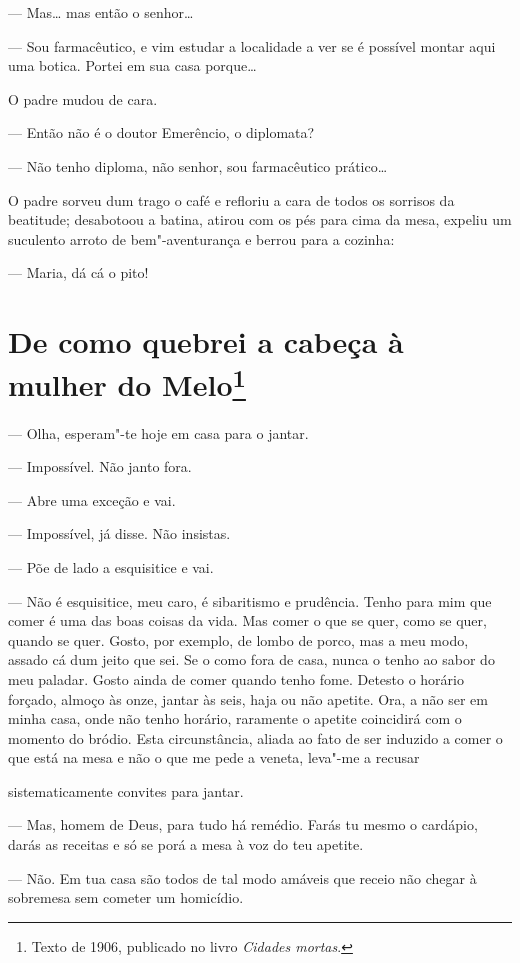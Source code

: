 --- Mas\ldots{} mas então o senhor\ldots{}

--- Sou farmacêutico, e vim estudar a localidade a ver se é possível
montar aqui uma botica. Portei em sua casa porque\ldots{}

O padre mudou de cara.

--- Então não é o doutor Emerêncio, o diplomata?

--- Não tenho diploma, não senhor, sou farmacêutico prático\ldots{}

O padre sorveu dum trago o café e refloriu a cara de todos os sorrisos
da beatitude; desabotoou a batina, atirou com os pés para cima da mesa,
expeliu um suculento arroto de bem"-aventurança e berrou para a cozinha:

--- Maria, dá cá o pito!

\chapter{De como quebrei a cabeça à mulher do Melo\footnote[*]{Texto de 1906, publicado no livro \emph{Cidades mortas}.}}

--- Olha, esperam"-te hoje em casa para o jantar.

--- Impossível. Não janto fora.

--- Abre uma exceção e vai.

--- Impossível, já disse. Não insistas.

--- Põe de lado a esquisitice e vai.

--- Não é esquisitice, meu caro, é sibaritismo e prudência. Tenho para
mim que comer é uma das boas coisas da vida. Mas comer o que se quer,
como se quer, quando se quer. Gosto, por exemplo, de lombo de porco, mas
a meu modo, assado cá dum jeito que sei. Se o como fora de casa, nunca o
tenho ao sabor do meu paladar. Gosto ainda de comer quando tenho fome.
Detesto o horário forçado, almoço às onze, jantar às seis, haja ou não
apetite. Ora, a não ser em minha casa, onde não tenho horário, raramente
o apetite coincidirá com o momento do bródio. Esta circunstância, aliada
ao fato de ser induzido a comer o que está na mesa e não o que me pede a
veneta, leva"-me a recusar

sistematicamente convites para jantar.

--- Mas, homem de Deus, para tudo há remédio. Farás tu mesmo o cardápio,
darás as receitas e só se porá a mesa à voz do teu apetite.

--- Não. Em tua casa são todos de tal modo amáveis que receio não chegar
à sobremesa sem cometer um homicídio.

